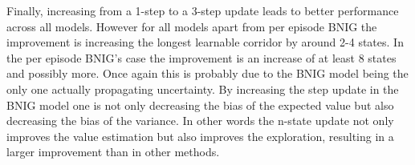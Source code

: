 Finally, increasing from a 1-step to a 3-step update leads to better performance across all models. However for all models apart from per episode BNIG the improvement is increasing the longest learnable corridor by around 2-4 states. In the per episode BNIG's case the improvement is an increase of at least 8 states and possibly more. Once again this is probably due to the BNIG model being the only one actually propagating uncertainty. By increasing the step update in the BNIG model one is not only decreasing the bias of the expected value but also decreasing the bias of the variance. In other words the n-state update not only improves the value estimation but also improves the exploration, resulting in a larger improvement than in other methods.








